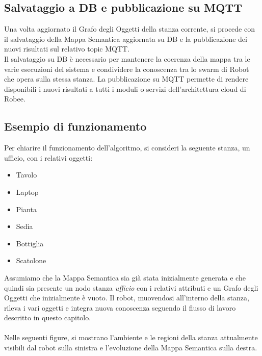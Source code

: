 \subsection{Salvataggio a DB e pubblicazione su MQTT}
Una volta aggiornato il Grafo degli Oggetti della stanza corrente, si procede con il salvataggio della Mappa Semantica aggiornata su DB e la pubblicazione dei nuovi risultati sul relativo topic MQTT.\\
Il salvataggio su DB è necessario per mantenere la coerenza della mappa tra le varie esecuzioni del sistema e condividere la conoscenza tra lo swarm di Robot che opera sulla stessa stanza. La pubblicazione su MQTT permette di rendere disponibili i nuovi risultati a tutti i moduli o servizi dell'architettura cloud di Robee.

\subsection{Esempio di funzionamento}
Per chiarire il funzionamento dell'algoritmo, si consideri la seguente stanza, un ufficio, con i relativi oggetti:
\begin{itemize}
	\item Tavolo
	\item Laptop
	\item Pianta
	\item Sedia
	\item Bottiglia
	\item Scatolone
\end{itemize}
Assumiamo che la Mappa Semantica sia già stata inizialmente generata e che quindi sia presente un nodo stanza \textit{ufficio} con i relativi attributi e un Grafo degli Oggetti che inizialmente è vuoto. Il robot, muovendosi all'interno della stanza, rileva i vari oggetti e integra nuova conoscenza seguendo il flusso di lavoro descritto in questo capitolo.\\\\
Nelle seguenti figure, si mostrano l'ambiente e le regioni della stanza attualmente visibili dal robot sulla sinistra e l'evoluzione della Mappa Semantica sulla destra.~
